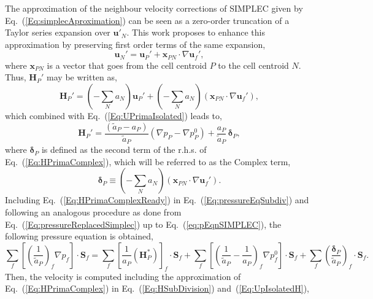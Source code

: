 \documentclass[final,3p,times,11pt,onecolumn]{myElsarticle}
\numberwithin{equation}{section}
\begin{document}
The approximation of the neighbour velocity corrections of SIMPLEC given by Eq.~(\ref{Eq:simplecAproximation}) can be seen as a zero-order truncation of a Taylor series expansion over $\boldsymbol{u}'_N$. This work proposes to enhance this approximation by preserving first order terms of the same expansion,
\begin{equation}\label{eq:uNTaylor}
\boldsymbol{u}_N' = \boldsymbol{u}_P' + \boldsymbol{x}_{PN}\cdot 
\nabla \boldsymbol{u}_f',
\end{equation}
where $\boldsymbol{x}_{PN}$ is a vector that goes from the cell centroid $P$ to the cell centroid $N$. Thus, $\boldsymbol{H}_P'$ may be written as,
\begin{equation}
\label{Eq:HPrimaComplex}
\boldsymbol{H}_P'
=
\left(
-\sum_N a_N
\right)
\boldsymbol{u}_P' 
+
\left(
-\sum_N a_N
\right)
\left(
\boldsymbol{x}_{PN}\cdot 
\nabla \boldsymbol{u}_f'
\right),
\end{equation}
which combined with Eq.~(\ref{Eq:UPrimaIsolated}) leads to,
\begin{equation}
\label{Eq:HPrimaComplexReady}
\boldsymbol{H}_P'
= 
\dfrac
{
\left(
\tilde{a}_P
-
a_P
\right)
}
{
\tilde{a}_P
}
\left(
\nabla p_P
-
\nabla p_P^{0}
\right)
+
\dfrac{a_P}{\tilde{a}_P}
\,
\boldsymbol{\delta}_P,
\end{equation}
where $\boldsymbol{\delta}_P$ is defined as the second term of the r.h.s. of Eq.~(\ref{Eq:HPrimaComplex}), which will be referred to as the Complex term,
\begin{equation}
\boldsymbol{\delta}_P 
\equiv 
\left(
-\sum_N a_N
\right)
\left(
\boldsymbol{x}_{PN}\cdot 
\nabla \boldsymbol{u}_f'
\right).
\end{equation}
Including Eq.~(\ref{Eq:HPrimaComplexReady}) in Eq.~(\ref{Eq:pressureEqSubdiv}) and following an analogous procedure as done from Eq.~(\ref{Eq:pressureReplacedSimplec}) up to Eq.~(\ref{eq:pEqnSIMPLEC}), the following pressure equation is obtained,
\begin{equation}
\label{Eq:pressureComplex}
\sum_f
\left[
\left(
\dfrac
{1}
{\tilde{a}_P}
\right)_f
\nabla p_f
\right]
\cdot 
\boldsymbol{S}_f
= 
\sum_f 
\left[
\frac{1}{a_P}
\left(
\boldsymbol{H}_P^*
\right)
\right]_f 
\cdot
\boldsymbol{S}_f
+
\sum_f
\left[
\left(
\dfrac
{1}
{\tilde{a}_P}
-
\dfrac
{1}
{a_P}
\right)_f
\nabla p^{0}_f
\right]
\cdot
\boldsymbol{S}_f
+
\sum_f
\left(
\dfrac{\boldsymbol{\delta}_P}{\tilde{a}_P}
\right)_f
\cdot
\boldsymbol{S}_f.
\end{equation}
Then, the velocity is computed including the approximation of Eq.~(\ref{Eq:HPrimaComplex}) in Eq.~(\ref{Eq:HSubDivision}) and~(\ref{Eq:UpIsolatedH}),
\end{document}
